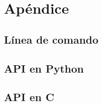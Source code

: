 \section{Apéndice}

\subsection{Línea de comando}

\subsection{API en Python}

\subsection{API en C}